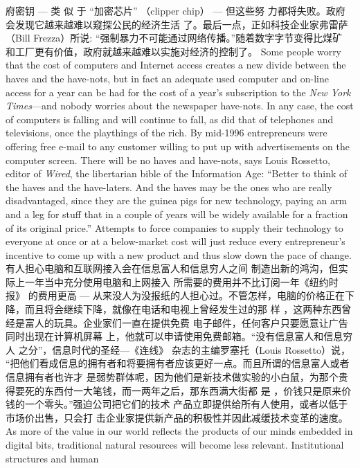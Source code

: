 \begin{paracol}{2}
府密钥 --- 类 似 于 “加密芯片” （clipper chip）  --- 但这些努
力都将失败。政府会发现它越来越难以窥探公民的经济生活
了。最后一点，正如科技企业家弗雷萨（Bill Frezza）所说:
“强制暴力不可能通过网络传播。”随着数字字节变得比煤矿
和工厂更有价值，政府就越来越难以实施对经济的控制了。
\switchcolumn*
Some people worry that the cost of computers and Internet access creates a new divide between the haves and the have-nots, but in fact an adequate used computer and on-line access
for a year can be had for the cost of a year's subscription to the
\textit{New York Times}---and nobody worries about the newspaper
have-nots. In any case, the cost of computers is falling and will
continue to fall, as did that of telephones and televisions, once
the playthings of the rich. By mid-1996 entrepreneurs were offering free e-mail to any customer willing to put up with advertisements on the computer screen. There will be no haves and
have-nots, says Louis Rossetto, editor of \textit{Wired}, the libertarian
bible of the Information Age: ``Better to think of the haves and
the have-laters. And the haves may be the ones who are really
disadvantaged, since they are the guinea pigs for new technology, paying an arm and a leg for stuff that in a couple of years
will be widely available for a fraction of its original price.'' Attempts to force companies to supply their technology to everyone at once or at a below-market cost will just reduce every
entrepreneur's incentive to come up with a new product and
thus slow down the pace of change.
\switchcolumn
有人担心电脑和互联网接入会在信息富人和信息穷人之间
制造出新的鸿沟，但实际上一年当中充分使用电脑和上网接入
所需要的费用并不比订阅一年《纽约时报》 的费用更高 ---
从来没人为没报纸的人担心过。不管怎样，电脑的价格正在下
降，而且将会继续下降，就像在电话和电视上曾经发生过的那
样 ，这两种东西曾经是富人的玩具。企业家们一直在提供免费
电子邮件，任何客户只要愿意让广告同时出现在计算机屏幕
上，他就可以申请使用免费邮箱。“没有信息富人和信息穷人
之分”，信息时代的圣经---《连线》 杂志的主编罗塞托（Louis Rossetto）说， “把他们看成信息的拥有者和将要拥有者应该更好一点。而且所谓的信息富人或者信息拥有者也许才
是弱势群体呢，因为他们是新技术做实验的小白鼠，为那个贵
得要死的东西付一大笔钱，而一两年之后，那东西满大街都
是 ，价钱只是原来价钱的一个零头。”强迫公司把它们的技术
产品立即提供给所有人使用，或者以低于市场价出售，只会打
击企业家提供新产品的积极性并因此减缓技术变革的速度。
\switchcolumn*
As more of the value in our world reflects the products of our
minds embedded in digital bits, traditional natural resources
will become less relevant. Institutional structures and human

\end{paracol}
